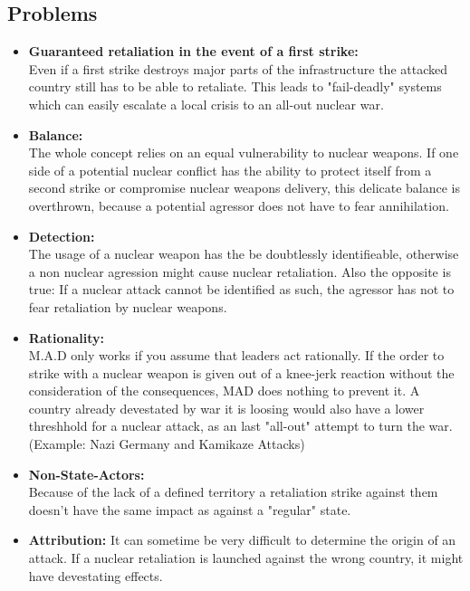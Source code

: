 \documentclass[12pt,twoside,a4paper]{scrartcl}
\begin{document}
      \subsection{ Problems}
        \begin{center}
            \begin{itemize}
                \item \textbf{Guaranteed retaliation in the event of a first strike:} \\
                        Even if a first strike destroys major parts of the infrastructure the attacked country still has to be able to retaliate. This leads to "fail-deadly" systems which can easily escalate a local crisis to an all-out nuclear war. 
                
                \item \textbf{Balance:} \\
                    The whole concept relies on an equal vulnerability to nuclear weapons. If one side of a potential nuclear conflict has the ability to protect itself from a second strike or compromise nuclear weapons delivery, this delicate balance is overthrown, because a potential agressor does not have to fear annihilation.
                \item \textbf{Detection:} \\
                        The usage of a nuclear weapon has the be doubtlessly identifieable, otherwise a non nuclear agression might cause nuclear retaliation. Also the opposite is true: If a nuclear attack cannot be identified as such, the agressor has not to fear retaliation by nuclear weapons.
                        
                \item \textbf{Rationality:} \\
                        M.A.D only works if you assume that leaders act rationally. If the order to strike with a nuclear weapon is given out of a knee-jerk reaction without the consideration of the consequences, MAD does nothing to prevent it. A country already devestated by war it is loosing would also have a lower threshhold for a nuclear attack, as an last "all-out" attempt to turn the war. (Example: Nazi Germany and Kamikaze Attacks)
                \item \textbf{Non-State-Actors:}\\
                        Because of the lack of a defined territory a retaliation strike against them doesn't have the same impact as against a "regular" state.
                        
                \item \textbf{Attribution:} It can sometime be very difficult to determine the origin of an attack. If a nuclear retaliation is launched against the wrong country, it might have devestating effects.
            \end{itemize}
        \end{center}
        
\end{document}
